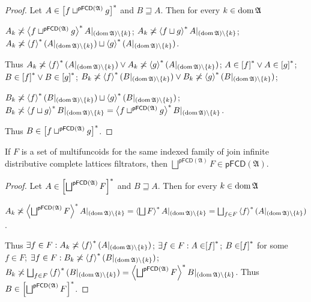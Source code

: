 \begin{proof}
Let $A\in\mathord{\mathrel{\left[f\sqcup^{\mathsf{pFCD}(\mathfrak{A})}g\right]^{\ast}}}$
and $B\sqsupseteq A$. Then for every $k\in\operatorname{dom}\mathfrak{A}$

$A_{k}\not\asymp\left\langle f\sqcup^{\mathsf{pFCD}(\mathfrak{A})}g\right\rangle ^{\ast}A|_{(\operatorname{dom}\mathfrak{A})\setminus\{k\}}$;
$A_{k}\not\asymp\left\langle f\sqcup g\right\rangle ^{\ast}A|_{(\operatorname{dom}\mathfrak{A})\setminus\{k\}}$; $A_{k}\not\asymp \left\langle f\right\rangle ^{\ast}(A|_{(\operatorname{dom}\mathfrak{A})\setminus\{k\}})\sqcup\left\langle g\right\rangle ^{\ast}(A|_{(\operatorname{dom}\mathfrak{A})\setminus\{k\}})$.

Thus $A_{k}\not\asymp\left\langle f\right\rangle ^{\ast}(A|_{(\operatorname{dom}\mathfrak{A})\setminus\{k\}})\lor A_{k}\not\asymp\left\langle g\right\rangle ^{\ast}(A|_{(\operatorname{dom}\mathfrak{A})\setminus\{k\}})$;
$A\in\mathord{\mathrel{\left[f\right]^{\ast}}}\lor A\in\mathord{\mathrel{\left[g\right]^{\ast}}}$; $B\in\mathord{\mathrel{\left[f\right]^{\ast}}}\lor B\in\mathord{\mathrel{\left[g\right]^{\ast}}}$;
$B_{k}\not\asymp\left\langle f\right\rangle ^{\ast}(B|_{(\operatorname{dom}\mathfrak{A})\setminus\{k\}})\lor B_{k}\not\asymp\left\langle g\right\rangle ^{\ast}(B|_{(\operatorname{dom}\mathfrak{A})\setminus\{k\}})$;

$B_{k}\not\asymp\left\langle f\right\rangle ^{\ast}(B|_{(\operatorname{dom}\mathfrak{A})\setminus\{k\}})\sqcup\left\langle g\right\rangle ^{\ast}(B|_{(\operatorname{dom}\mathfrak{A})\setminus\{k\}})$;
$B_{k}\not\asymp\left\langle f\sqcup g\right\rangle ^{\ast}B|_{(\operatorname{dom}\mathfrak{A})\setminus\{k\}}=\left\langle f\sqcup^{\mathsf{pFCD}(\mathfrak{A})}g\right\rangle ^{\ast}B|_{(\operatorname{dom}\mathfrak{A})\setminus\{k\}}$.

Thus $B\in\mathord{\mathrel{\left[f\sqcup^{\mathsf{pFCD}(\mathfrak{A})}g\right]^{\ast}}}$.\end{proof}
\begin{thm}
If $F$ is a set of multifuncoids for the same indexed family of join
infinite distributive complete lattices filtrators, then $\bigsqcup^{\mathsf{pFCD}(\mathfrak{A})}F\in\mathsf{pFCD}(\mathfrak{A})$.\end{thm}
\begin{proof}
Let $A\in\mathord{\mathrel{\left[\bigsqcup^{\mathsf{pFCD}(\mathfrak{A})}F\right]^{\ast}}}$
and $B\sqsupseteq A$. Then for every $k\in\operatorname{dom}\mathfrak{A}$

$A_{k}\not\asymp\left\langle \bigsqcup^{\mathsf{pFCD}(\mathfrak{A})}F\right\rangle ^{\ast}A|_{(\operatorname{dom}\mathfrak{A})\setminus\{k\}}=\left\langle \bigsqcup F\right\rangle ^{\ast}A|_{(\operatorname{dom}\mathfrak{A})\setminus\{k\}}=\bigsqcup_{f\in F}\left\langle f\right\rangle ^{\ast}(A|_{(\operatorname{dom}\mathfrak{A})\setminus\{k\}})$.

Thus $\exists f\in F:A_{k}\not\asymp\left\langle f\right\rangle ^{\ast}(A|_{(\operatorname{dom}\mathfrak{A})\setminus\{k\}})$;
$\exists f\in F:A\in\mathrel{\left[f\right]^{\ast}}$; $B\in\mathrel{\left[f\right]^{\ast}}$ for some
$f\in F$; $\exists f\in F:B_{k}\not\asymp\left\langle f\right\rangle ^{\ast}(B|_{(\operatorname{dom}\mathfrak{A})\setminus\{k\}})$;
$B_{k}\not\asymp\bigsqcup_{f\in F}\left\langle f\right\rangle ^{\ast}(B|_{(\operatorname{dom}\mathfrak{A})\setminus\{k\}})=\left\langle \bigsqcup^{\mathsf{pFCD}(\mathfrak{A})}F\right\rangle ^{\ast}B|_{(\operatorname{dom}\mathfrak{A})\setminus\{k\}}$.
Thus $B\in\mathord{\mathrel{\left[\bigsqcup^{\mathsf{pFCD}(\mathfrak{A})}F\right]^{\ast}}}$.
\end{proof}

